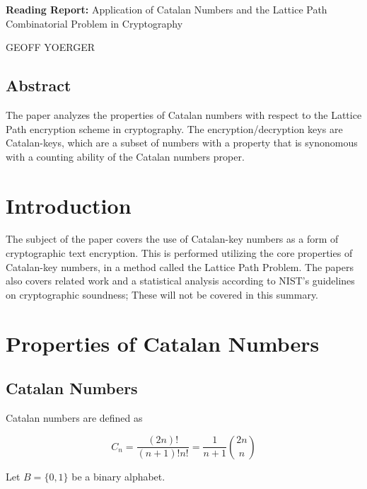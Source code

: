 \documentclass[12pt]{article} %
\begin{document}
\begin{center}
    \Large{
        \textbf{Reading Report:}
        Application of Catalan Numbers and the Lattice
Path Combinatorial Problem in Cryptography
    }
    
    \vspace{5pt}
        
    \normalsize{
        GEOFF YOERGER

        \usdate
    }
    
    \vspace{15pt}

    \subsection*{Abstract}

    The paper analyzes the properties of Catalan numbers with respect to the Lattice Path encryption scheme in cryptography. The encryption/decryption keys are Catalan-keys, which are a subset of numbers with a property that is synonomous with a counting ability of the Catalan numbers proper.
\end{center}
    
\section{Introduction} 

The subject of the paper covers the use of Catalan-key numbers as a form of cryptographic text encryption.  This is performed utilizing the core properties of Catalan-key numbers, in a method called the Lattice Path Problem.  The papers also covers related work and a statistical analysis according to NIST's guidelines on cryptographic soundness;  These will not be covered in this summary.

\section{Properties of Catalan Numbers} 

\subsection{Catalan Numbers}

Catalan numbers are defined as

$$
C_n = \frac{(2n)!}{(n+1)!n!} = \frac{1}{n+1} {2n \choose n}
$$

Let $B = \{0, 1\}$ be a binary alphabet.
\end{document}
